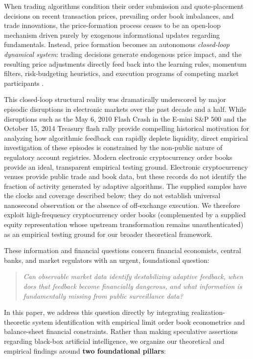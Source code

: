 \documentclass[12pt]{article}
\theoremstyle{definition}
\theoremstyle{remark}
\begin{document}
When trading algorithms condition their order submission and quote-placement decisions on recent transaction prices, prevailing order book imbalances, and trade innovations, the price-formation process ceases to be an open-loop mechanism driven purely by exogenous informational updates regarding fundamentals. Instead, price formation becomes an autonomous \emph{closed-loop dynamical system}: trading decisions generate endogenous price impact, and the resulting price adjustments directly feed back into the learning rules, momentum filters, risk-budgeting heuristics, and execution programs of competing market participants \citep{bouchaud2004fluctuations,cont2010stochastic,cont2014}. 

This closed-loop structural reality was dramatically underscored by major episodic disruptions in electronic markets over the past decade and a half. While disruptions such as the May 6, 2010 Flash Crash in the E-mini S\&P 500 and the October 15, 2014 Treasury flash rally provide compelling historical motivation for analyzing how algorithmic feedback can rapidly deplete liquidity, direct empirical investigation of these episodes is constrained by the non-public nature of regulatory account registries. Modern electronic cryptocurrency order books provide an ideal, transparent empirical testing ground. Electronic cryptocurrency venues provide public trade and book data, but these records do not identify the fraction of activity generated by adaptive algorithms. The supplied samples have the clocks and coverage described below; they do not establish universal nanosecond observation or the absence of off-exchange execution. We therefore exploit high-frequency cryptocurrency order books (complemented by a supplied equity representation whose upstream transformation remains unauthenticated) as an empirical testing ground for our broader theoretical framework.

These information and financial questions concern financial economists, central banks, and market regulators with an urgent, foundational question:
\begin{quote}
\centering
\emph{Can observable market data identify destabilizing adaptive feedback, when does that feedback become financially dangerous, and what information is fundamentally missing from public surveillance data?}
\end{quote}

In this paper, we address this question directly by integrating realization-theoretic system identification with empirical limit order book econometrics and balance-sheet financial constraints. Rather than making speculative assertions regarding black-box artificial intelligence, we organize our theoretical and empirical findings around \textbf{two foundational pillars}:
\end{document}
